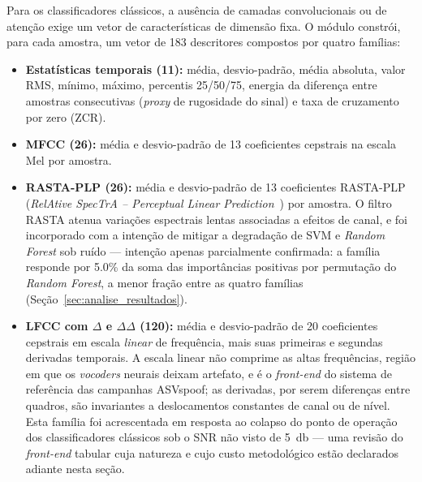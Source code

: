 \documentclass[12pt,a4paper]{article}
\begin{document}
Para os classificadores clássicos, a ausência de camadas convolucionais ou de
atenção exige um vetor de características de dimensão fixa. O módulo
 constrói, para cada amostra, um vetor de
\num{183} descritores compostos por quatro famílias:
\begin{itemize}
	\item \textbf{Estatísticas temporais (11):} média, desvio-padrão, média
	absoluta, valor RMS, mínimo, máximo, percentis 25/50/75, energia da
	diferença entre amostras consecutivas (\textit{proxy} de rugosidade do sinal) e
	taxa de cruzamento por zero (ZCR).
	\item \textbf{MFCC (26):} média e desvio-padrão de \num{13} coeficientes
	cepstrais na escala Mel por amostra.
	\item \textbf{RASTA-PLP (26):} média e desvio-padrão de \num{13}
	coeficientes RASTA-PLP (\textit{RelAtive SpecTrA -- Perceptual Linear
		Prediction}~\cite{hermansky1994rasta}) por amostra. O filtro RASTA atenua
	variações espectrais lentas associadas a efeitos de canal, e foi
	incorporado com a intenção de mitigar a degradação de SVM e \textit{Random
		Forest} sob ruído --- intenção apenas parcialmente confirmada: a família
	responde por \num{5,0}\% da soma das importâncias positivas por permutação do
	\textit{Random Forest}, a menor fração entre as quatro famílias
	(Seção~\ref{sec:analise_resultados}).
	\item \textbf{LFCC com $\Delta$ e $\Delta\Delta$ (120):} média e
	desvio-padrão de \num{20} coeficientes cepstrais em escala \emph{linear}
	de frequência, mais suas primeiras e segundas derivadas temporais. A
	escala linear não comprime as altas frequências, região em que os
	\textit{vocoders} neurais deixam artefato, e é o \textit{front-end} do
	sistema de referência das campanhas ASVspoof; as derivadas, por serem
	diferenças entre quadros, são invariantes a deslocamentos constantes de
	canal ou de nível. Esta família foi acrescentada em resposta ao colapso
	do ponto de operação dos classificadores clássicos sob o SNR não visto de
	\SI{5}{\decibel} --- uma revisão do \textit{front-end} tabular cuja
	natureza e cujo custo metodológico estão declarados adiante nesta seção.
\end{itemize}
\end{document}
